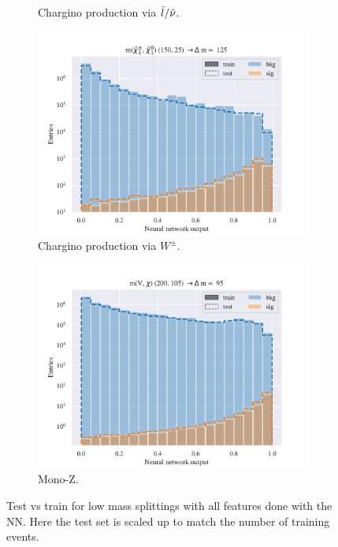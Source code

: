 \begin{figure}[H]
\begin{subfigure}[t!]{0.49\textwidth}
        \caption{Chargino production via $\Tilde{l}/\Tilde{\nu}$.}
        \label{fig:SlepsnuNNLow}
    \end{subfigure}    
    \begin{subfigure}[t!]{0.49\textwidth}
        \includegraphics[width = \textwidth]{Figures/WW/NN/All_level/Low/scaled_train_test_395268.pdf}
        \caption{Chargino production via $W^\pm$.}
        \label{fig:WWNNLow}
    \end{subfigure}
    \begin{subfigure}[t!]{0.49\textwidth}
        \includegraphics[width = \textwidth]{Figures/Mono_Z/ML/NN/All_level/Low/scaled_train_test_310604.pdf}
        \caption{Mono-Z.}
        \label{fig:MonoZNNLow}
    \end{subfigure}
    \caption{Test vs train for low mass splittings with all features done with the NN. Here the test set is scaled up to match the number of training events.}
    \label{fig:AllLowNN}
\end{figure}

